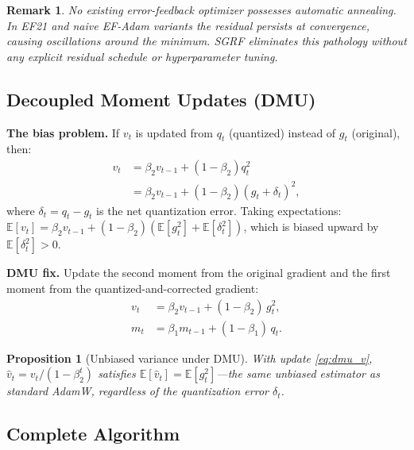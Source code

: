 \documentclass[10pt,twocolumn]{article}
\newtheorem{proposition}{Proposition}
\newtheorem{remark}{Remark}
\begin{document}
\begin{remark}
No existing error-feedback optimizer possesses automatic annealing.
In EF21 and naive EF-Adam variants the residual persists at convergence,
causing oscillations around the minimum.  SGRF eliminates this pathology
without any explicit residual schedule or hyperparameter tuning.
\end{remark}

\subsection{Decoupled Moment Updates (DMU)}
\label{sec:dmu}

\textbf{The bias problem.}  If $v_t$ is updated from $q_t$ (quantized)
instead of $g_t$ (original), then:
\begin{align}
  v_t &= \beta_2 v_{t-1} + (1-\beta_2) q_t^2 \\
      &= \beta_2 v_{t-1} + (1-\beta_2) (g_t + \delta_t)^2,
\end{align}
where $\delta_t = q_t - g_t$ is the net quantization error.
Taking expectations: $\mathbb{E}[v_t] = \beta_2 v_{t-1} +
(1-\beta_2)(\mathbb{E}[g_t^2] + \mathbb{E}[\delta_t^2])$,
which is biased upward by $\mathbb{E}[\delta_t^2] > 0$.

\textbf{DMU fix.}  Update the second moment from the original gradient
and the first moment from the quantized-and-corrected gradient:
\begin{align}
  v_t &= \beta_2 v_{t-1} + (1-\beta_2)\, g_t^2, \label{eq:dmu_v}\\
  m_t &= \beta_1 m_{t-1} + (1-\beta_1)\, q_t. \label{eq:dmu_m}
\end{align}

\begin{proposition}[Unbiased variance under DMU]
With update \eqref{eq:dmu_v}, $\hat{v}_t = v_t/(1-\beta_2^t)$ satisfies
$\mathbb{E}[\hat{v}_t] = \mathbb{E}[g_t^2]$—the same unbiased estimator
as standard AdamW, regardless of the quantization error $\delta_t$.
\end{proposition}

\subsection{Complete Algorithm}
\end{document}
